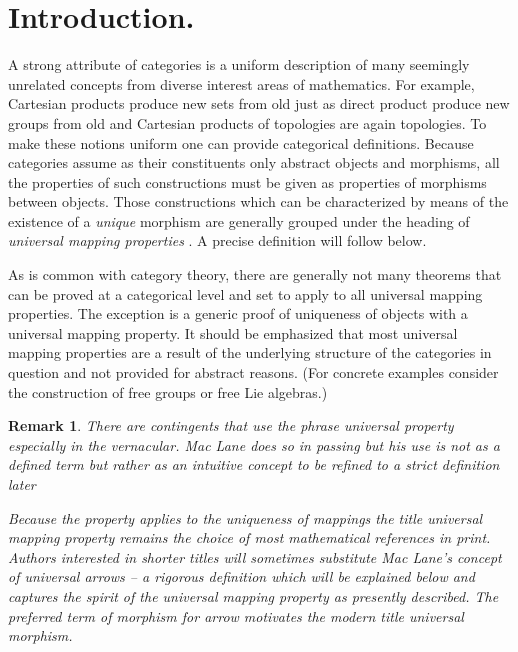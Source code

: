\documentclass[12pt]{article}
\newtheorem{remark}[thm]{Remark}
\begin{document}

\section{Introduction.}

A strong attribute of categories is a uniform description of many seemingly
unrelated concepts from diverse interest areas of mathematics.  For example, 
Cartesian products produce new sets from old just as direct product produce
new groups from old and Cartesian products of topologies are again topologies.
To make these notions uniform one can provide categorical definitions.  Because
categories assume as their constituents only abstract objects and morphisms,
all the properties of such constructions must be given as properties of morphisms
between objects.  Those constructions which can be characterized by means of the
existence of a \emph{unique} morphism are generally grouped under the heading
of \emph{universal mapping properties} \cite[p. 57]{Hungerford}.  A precise
definition will follow below.

As is common with category theory, there are generally not many theorems
that can be proved at a categorical level and set to apply to all universal 
mapping properties.  The exception is a generic proof of uniqueness of objects 
with a universal mapping property.  It should be emphasized that most universal 
mapping properties are a result of the underlying structure of the categories in 
question and not provided for abstract reasons.  (For concrete examples 
consider the construction of free groups or free Lie algebras.)

\begin{remark}
There are contingents that use the phrase \emph{universal property} especially in
the vernacular.  Mac Lane does so in passing but his use is not as a defined term but
rather as an intuitive concept to be refined to a strict definition later \cite[p. 2]{MacLane}

Because the property applies to the uniqueness of mappings the title \emph{universal 
mapping property} remains the choice of most mathematical references in print.
Authors interested in shorter titles will sometimes substitute Mac Lane's concept
of \emph{universal arrows}\cite[III.1]{MacLane} -- a rigorous definition which will 
be explained below and captures the spirit of the universal mapping property as
presently described.  The preferred term of morphism for arrow motivates the modern
title \emph{universal morphism}.
\end{remark}
\end{document}
